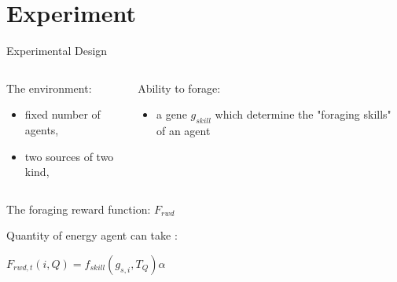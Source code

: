 \documentclass[8pt, handout=show,notes=show]{beamer}
\begin{document}




\section{Experiment}

\begin{frame}{Experimental Design}
\begin{columns}[t]



\begin{block}{The environment:}
\begin{itemize}
\item fixed number of agents,
\item two sources of two kind,
\end{itemize}
\end{block}


\begin{block}{Ability to forage:}
\begin{itemize}
\item a gene $g_{skill}$ which determine the "foraging skills" of an agent
\end{itemize}

\end{block}

\end{columns}


\begin{columns}



\begin{block}{The foraging reward function: $F_{rwd}$}

Quantity of energy agent can take :

$F_{rwd,t}(i,Q) = f_{skill}\left(g_{s,i},T_Q\right)\alpha$%

\end{block}



\end{columns}
\end{frame}
\end{document}
